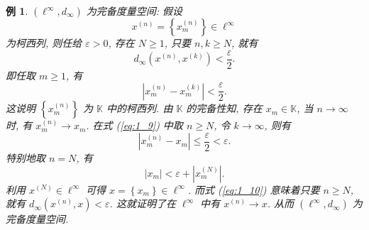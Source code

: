 \documentclass[openany]{ctexbook}
\theoremstyle{kaiti}
\theoremstyle{normal}
\newtheorem{example}{例}[section]
\begin{document}
\begin{example}
$\left(\ell^{\infty}, d_{\infty}\right)$ 为完备度量空间: 假设
$$
x^{(n)}=\left\{x_m^{(n)}\right\} \in \ell^{\infty}
$$
为柯西列, 则任给 $\varepsilon>0$, 存在 $N \geqslant 1$, 只要 $n, k \geqslant N$, 就有
$$
d_{\infty}\left(x^{(n)}, x^{(k)}\right)<\frac{\varepsilon}{2}.
$$
即任取 $m \geqslant 1$, 有
\begin{equation}
  \label{eq:1_9}
  \left|x_m^{(n)}-x_m^{(k)}\right|<\frac{\varepsilon}{2}.
\end{equation}
这说明 $\left\{x_m^{(n)}\right\}$ 为 $\mathbb{K}$ 中的柯西列. 由 $\mathbb{K}$ 的完备性知, 存在 $x_m \in \mathbb{K}$, 当 $n \rightarrow \infty$ 时, 有 $x_m^{(n)} \rightarrow x_m$. 在式 (\ref{eq:1_9}) 中取 $n \geqslant N$, 令 $k \rightarrow \infty$, 则有
\begin{equation}
  \label{eq:1_10}
  \left|x_m^{(n)}-x_m\right| \leqslant \frac{\varepsilon}{2}<\varepsilon.
\end{equation}
特别地取 $n=N$, 有
$$
\left|x_m\right|<\varepsilon+\left|x_m^{(N)}\right|.
$$
利用 $x^{(N)} \in \ell^{\infty}$ 可得 $x=\left\{x_m\right\} \in \ell^{\infty}$. 而式 (\ref{eq:1_10}) 意味着只要 $n \geqslant N$, 就有 $d_{\infty}\left(x^{(n)}, x\right)<\varepsilon$. 这就证明了在 $\ell^{\infty}$ 中有 $x^{(n)} \rightarrow x$. 从而 $\left(\ell^{\infty}, d_{\infty}\right)$ 为完备度量空间.
\end{example}
\end{document}
